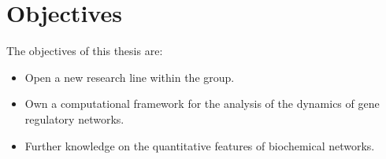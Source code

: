 \chapter{Objectives}
The objectives of this thesis are:
\begin{itemize}
\item
  Open a new research line within the group.
\item
  Own a computational framework for the analysis of the dynamics of gene regulatory networks.
\item
  Further knowledge on the quantitative features of biochemical networks.
\end{itemize}